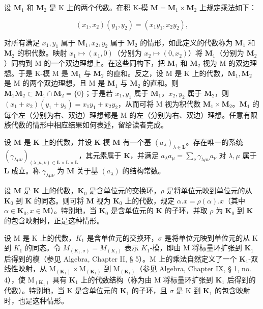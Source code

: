 设 \(\mathbf{M}_1\) 和 \(\mathbf{M}_2\) 是 K 上的两个代数。在积 K-模 \(\mathbf{M} = \mathbf{M}_1 \times \mathbf{M}_2\) 上规定乘法如下：

\[
(x _ {1}, x _ {2}) (y _ {1}, y _ {2}) = (x _ {1} y _ {1}, x _ {2} y _ {2}),
\]

对所有满足 \(x_1, y_1\) 属于 \(\mathbf{M}_1, x_2, y_2\) 属于 \(\mathbf{M}_2\) 的情形，如此定义的代数称为 \(\mathbf{M}_1\) 和 \(\mathbf{M}_2\) 的积代数。映射 \(x_1 \mapsto (x_1, 0)\)（分别为 \(x_2 \mapsto (0, x_2)\)）将 \(\mathbf{M}_1\)（分别为 \(\mathbf{M}_2\)）同构到 M 的一个双边理想上。在这些同构下，把 \(\mathbf{M}_1\) 和 \(\mathbf{M}_2\) 视为 M 的双边理想。于是 K-模 M 是 \(\mathbf{M}_1\) 与 \(\mathbf{M}_2\) 的直和。反之，设 M 是 K 上的代数，\(\mathbf{M}_1, \mathbf{M}_2\) 是 M 的两个双边理想，且 M 是 \(\mathbf{M}_1\) 与 \(\mathbf{M}_2\) 的直和。则 \(\mathbf{M}_1\mathbf{M}_2 \subset \mathbf{M}_1 \cap \mathbf{M}_2 = \{0\}\)；于是若 \(x_1, y_1\) 属于 \(\mathbf{M}_1\)，\(x_2, y_2\) 属于 \(\mathbf{M}_2\)，则 \((x_1 + x_2)(y_1 + y_2) = x_1y_1 + x_2y_2\)，从而可将 M 视为积代数 \(\mathbf{M}_1 \times \mathbf{M}_2\)。\(\mathbf{M}_1\) 的每个左（分别为右、双边）理想都是 M 的左（分别为右、双边）理想。任意有限族代数的情形中相应结果如何表述，留给读者完成。

设 \(\mathbf{M}\) 是 \(\mathbf{K}\) 上的代数，并设 \(\mathbf{K}\)-模 \(\mathbf{M}\) 有一个基 \((a_{\lambda})_{\lambda \in \mathbf{L}}\)。存在唯一的系统 \((\gamma_{\lambda \mu \nu})_{(\lambda, \mu, \nu) \in \mathbf{L} \times \mathbf{L} \times \mathbf{L}}\)，其元素属于 \(\mathbf{K}\)，并满足 \(a_{\lambda}a_{\mu} = \sum_{\nu} \gamma_{\lambda \mu \nu}a_{\nu}\) 对 \(\lambda, \mu\) 属于 \(\mathbf{L}\) 成立。称 \(\gamma_{\lambda \mu \nu}\) 为 \(\mathbf{M}\) 关于基 \((a_{\lambda})\) 的结构常数。

设 \(\mathbf{M}\) 是 \(\mathbf{K}\) 上的代数，\(\mathbf{K}_0\) 是含单位元的交换环，\(\rho\) 是将单位元映到单位元的从 \(\mathbf{K}_0\) 到 \(\mathbf{K}\) 的同态。则可将 \(\mathbf{M}\) 视为 \(\mathbf{K}_0\) 上的代数，规定 \(\alpha.x = \rho(\alpha).x\)（其中 \(\alpha \in \mathbf{K}_0, x \in \mathbf{M}\)）。特别地，当 \(\mathbf{K}_0\) 是含单位元的 \(\mathbf{K}\) 的子环，并取 \(\rho\) 为 \(\mathbf{K}_0\) 到 \(\mathbf{K}\) 的包含映射时，正是这种情形。

设 M 是 K 上的代数，\(K_{1}\) 是含单位元的交换环，\(\sigma\) 是将单位元映到单位元的从 K 到 \(K_{1}\) 的同态。令 \(M_{(K_{1},\sigma)} = M_{(K_{1})}\) 表示 \(K_{1}\)-模，即由 M 将标量环扩张到 \(\mathbf{K}_1\) 后得到的模（参见 Algebra, Chapter II, § 5）。M 上的乘法自然定义了一个 \(\mathbf{K}_1\)-双线性映射，从 \(\mathrm{M}_{(\mathbf{K}_1)} \times \mathrm{M}_{(\mathbf{K}_1)}\) 到 \(\mathrm{M}_{(\mathbf{K}_1)}\)（参见 Algebra, Chapter IX, § 1, no. 4），使 \(\mathrm{M}_{(\mathbf{K}_1)}\) 具有 \(\mathbf{K}_1\) 上的代数结构（称为由 M 将标量环扩张到 \(\mathbf{K}_1\) 后得到的代数）。特别地，当 K 是含单位元的 \(\mathbf{K}_1\) 的子环，且 \(\sigma\) 是 K 到 \(\mathbf{K}_1\) 的包含映射时，也是这种情形。

